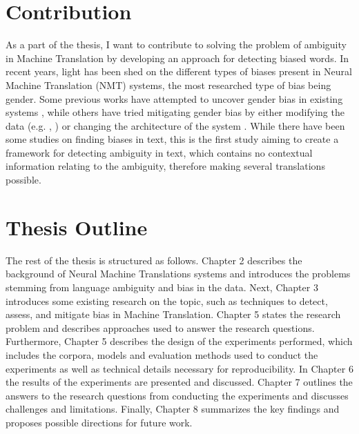 \section{Contribution}
\label{sec:Introduction:Contribution}

As a part of the thesis, I want to contribute to solving the problem of ambiguity in Machine Translation by developing an approach for detecting biased words. In recent years, light has been shed on the different types of biases present in Neural Machine Translation (NMT) systems, the most researched type of bias being gender. Some previous works have attempted to uncover gender bias in existing systems \parencite{Prates_2019}, while others have tried mitigating gender bias by either modifying the data (e.g. \cite{Escud_Font_2019}, \cite{Stanovsky_2019}) or changing the architecture of the system \parencite{Vanmassenhove_2018}. While there have been some studies on finding biases in text, this is the first study aiming to create a framework for detecting ambiguity in text, which contains no contextual information relating to the ambiguity, therefore making several translations possible.


\section{Thesis Outline}
\label{sec:Introduction:Outline}
The rest of the thesis is structured as follows. Chapter 2 describes the background of Neural Machine Translations systems and introduces the problems stemming from language ambiguity and bias in the data. Next, Chapter 3 introduces some existing research on the topic, such as techniques to detect, assess, and mitigate bias in Machine Translation. Chapter 5 states the research problem and describes approaches used to answer the research questions. Furthermore, Chapter 5 describes the design of the experiments performed, which includes the corpora, models and evaluation methods used to conduct the experiments as well as technical details necessary for reproducibility. In Chapter 6 the results of the experiments are presented and discussed. Chapter 7 outlines the answers to the research questions from conducting the experiments and discusses challenges and limitations. Finally, Chapter 8 summarizes the key findings and proposes possible directions for future work.